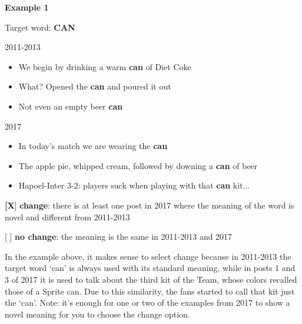 \documentclass[11pt,a4paper]{article}
\begin{document}
\begin{minipage}{15cm}
\vspace*{0.5cm}

\textbf{Example 1}

\vspace*{0.5cm}

Target word: \textbf{CAN}

\vspace*{0.25cm}
2011-2013
\begin{itemize}
\item We begin by drinking a warm \textbf{can} of Diet Coke
\item What? Opened the \textbf{can} and poured it out
\item Not even an empty beer \textbf{can}
\end{itemize}

\vspace*{0.25cm}

2017
\begin{itemize}
\item In today's match we are wearing the \textbf{can}
\item The apple pie, whipped cream, followed by downing a \textbf{can} of beer
\item Hapoel-Inter 3-2: players suck when playing with that \textbf{can} kit...
\end{itemize}

\vspace*{0.25cm}

\textbf{[X}] \textbf{change}: there is at least one post in 2017 where the meaning of the word is novel and different from 2011-2013

[  ] \textbf{no change}: the meaning is the same in 2011-2013 and 2017

\vspace*{0.25cm}

In the example above, it makes sense to select change because in 2011-2013 the target word `can' is always used with its standard meaning, while in posts 1 and 3 of  2017 it is used to talk about the third kit of the Team, whose colors recalled those of a Sprite can. Due to this similarity, the fans started to call that kit just the `can'. 
Note: it's enough for one or two of the examples from 2017 to show a novel meaning for you to choose the change option.

\end{minipage}

\pagebreak

\clearpage

\end{document}
